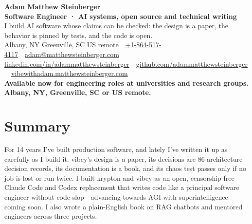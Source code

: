 \documentclass[10pt,letterpaper]{article}
\newcommand{\szname}{\fontsize{20pt}{24pt}\selectfont}
\newcommand{\sztitle}{\fontsize{10.5pt}{13pt}\selectfont}
\newcommand{\szbody}{\fontsize{9pt}{10.8pt}\selectfont}
\newcommand{\szmeta}{\fontsize{8pt}{10pt}\selectfont}
\begin{document}
\color{ink}\szbody

\begin{center}
{\szname\bfseries\color{primary} Adam Matthew Steinberger}\\[3pt]
{\sztitle\bfseries\color{accent} Software Engineer · AI systems, open source and technical writing}\\[4pt]
{\szbody I build AI software whose claims can be checked: the design is a paper, the behavior is pinned by tests, and the code is open.}\\[6pt]
{\szmeta\color{muted} Albany, NY \textbullet{} Greenville, SC \textbullet{} US remote\ {\color{rulecolor}\textbar}\ \href{tel:+18645174117}{+1-864-517-4117}\ {\color{rulecolor}\textbar}\ \href{mailto:adam@matthewsteinberger.com}{adam@matthewsteinberger.com}}\\[2pt]
{\szmeta\color{muted} \href{https://www.linkedin.com/in/adammatthewsteinberger/}{linkedin.com/in/adammatthewsteinberger}\ {\color{rulecolor}\textbar}\ \href{https://github.com/adammatthewsteinberger}{github.com/adammatthewsteinberger}\ {\color{rulecolor}\textbar}\ \href{https://vibewithadam.matthewsteinberger.com}{vibewithadam.matthewsteinberger.com}}\\[6pt]
{\szbody\bfseries Available now for engineering roles at universities and research groups. Albany, NY, Greenville, SC or US remote.}
\end{center}
\vspace{-6pt}
\section*{Summary}
For 14 years I've built production software, and lately I've written it up as carefully as I build it. vibey's design is a paper, its decisions are 86 architecture decision records, its documentation is a book, and its chaos test passes only if no job is lost or run twice. I built krypton and vibey as an open, censorship-free Claude Code and Codex replacement that writes code like a principal software engineer without code slop—advancing towards AGI with superintelligence coming soon. I also wrote a plain-English book on RAG chatbots and mentored engineers across three projects.\par
\end{document}
